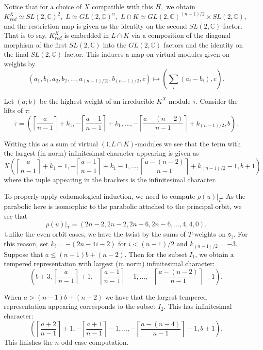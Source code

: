 \documentclass[letterpaper,twosided,11pt]{article}
\theoremstyle{plain}
\theoremstyle{definition}
\theoremstyle{remark}
\newcommand{\C}{\mathbb{C}}
\newcommand{\lie}[1]{\mathfrak{#1}}
\begin{document}
  Notice that for a choice of $X$ compatible with this $H,$ we obtain
   $K^X_{red}\simeq SL(2,\C)^2,$ $L\simeq GL(2,\C)^n,$ $L\cap K\simeq GL(2,\C)^{(n-1)/2}\times SL(2,\C),$
    and the restriction map is given as the identity on the second $SL(2,\C)$-factor.
     That is to say, $K^X_{red}$ is embedded in $L\cap K$ via a composition of the diagonal morphism
      of the first $SL(2,\C)$ into the $GL(2,\C)$ factors and the identity on the final $SL(2,\C)$-factor. 
      This induces a map on virtual modules given on weights 
      by \[ (a_1,b_1,a_2,b_2,...,a_{(n-1)/2)},b_{(n-1)/2},c)\mapsto (\sum_{i} (a_i-b_i),c).\]
      
Let $(a;b)$ be the highest weight of an irreducible $K^X$-module $\tau$. 
Consider the lifts of $\tau$: \[ \tilde{\tau}=\left( \left\lceil \frac{a}{n-1} \right \rceil+k_1, -\left\lceil \frac{a-1}
    {n-1} \right \rceil+k_1 ,...,-\left\lceil \frac{a-(n-2)}{n-1} \right \rceil +k_{(n-1)/2}, b \right).\]
    
Writing this as a sum of virtual $(\lie{l},L\cap K)$-modules we see that the
term with the largest (in norm) infinitesimal character appearing is given as 
\[ X\left( \left\lceil \frac{a}{n-1} \right \rceil+k_1+1,- \left\lceil \frac{a-1}
    {n-1} \right \rceil+k_1-1 ,... ,\left\lceil \frac{a-(n-2)}{n-1} \right \rceil +k_{(n-1)/2}-1, b+1 \right)\]
    where the tuple appearing in the brackets is the infinitesimal character. 
    
To properly apply cohomological induction, we need to compute $\rho(u)|_T.$
 As the parabolic here is isomorphic to the parabolic attached to the principal orbit,
 we see that \[\rho(u)|_T=(2n-2,2n-2,2n-6,2n-6,...,4,4,0).\]
 Unlike the even orbit cases, we have the twist by the sums of $T$-weights on $\lie{s}_1$. 
 For this reason, set $k_i=-(2n-4i-2)$ for $i<(n-1)/2$ and $k_{(n-1)/2}=-3.$ Suppose that $a\leq (n-1)b+(n-2).$ 
 Then for the subset $I_1$, we obtain a tempered representation 
 with largest (in norm) infinitesimal character: 
  \begin{equation}\label{Subregular_odd_1}   \left(b+3,\left\lceil  \frac{a}{n-1} \right \rceil+1, -\left\lceil \frac{a-1}
    {n-1} \right \rceil-1 ,... ,-\left\lceil \frac{a-(n-2)}{n-1} \right \rceil-1 \right).  \end{equation}

When $a>(n-1)b+(n-2)$ we have that the largest tempered representation appearing
corresponds to the subset $I_2.$ This has infinitesimal character: 
  \begin{equation}\label{Subregular_odd_2}  \left(\left\lceil  \frac{a+2}{n-1} \right \rceil+1, -\left\lceil \frac{a+1}
    {n-1} \right \rceil-1 ,... ,-\left\lceil \frac{a-(n-4)}{n-1} \right \rceil-1,b+1 \right).  \end{equation} 
This finishes the $n$ odd case computation. 
\end{document}
